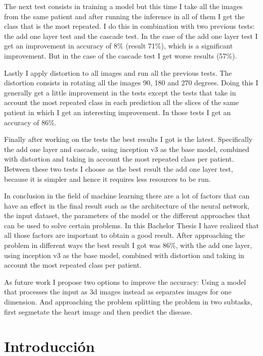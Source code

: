 \documentclass[12pt,a4paper]{article}
\begin{document}
The next test consists in training a model but this time I take all the images from the same patient and after running the inference in all of them I get the class that is the most repeated. I do this in combination with two previous tests: the add one layer test and the cascade test. In the case of the add one layer test I get an improvement in accuracy of 8\% (result 71\%), which is a significant improvement. But in the case of the cascade test I get worse results (57\%).
\bigskip

Lastly I apply distortion to all images and run all the previous tests. The distortion consists in rotating all the images 90, 180 and 270 degrees. Doing this I generally get a little improvement in the tests except the tests that take in account the most repeated class in each prediction all the slices of the same patient in which I get an interesting improvement. In those tests I get an accuracy of 86\%.
\bigskip

Finally after working on the tests the best results I got is the latest. Specifically the add one layer and cascade, using inception v3 as the base model, combined with distortion and taking in account the most repeated class per patient. Between these two tests I choose as the best result the add one layer test, because it is simpler and hence it requires less resources to be run.
\bigskip

In conclusion in the field of machine learning there are a lot of factors that can have an effect in the final result such as the architecture of the neural network, the input dataset, the parameters of the model or the different approaches that can be used to solve certain problems. In this Bachelor Thesis I have realized that all those factors are important to obtain a good result. After approaching the problem in different ways the best result I got was 86\%, with the add one layer, using inception v3 as the base model, combined with distortion and taking in account the most repeated class per patient.
\bigskip

As future work I propose two options to improve the accuracy: Using a model that processes the input as 3d images instead as separates images for one dimension. And approaching the problem splitting the problem in two subtasks, first segmetate the heart image and then predict the disease.

\newpage
\section{Introducción}
\fancyhead[L]{\nouppercase{\rightmark}}
\end{document}
